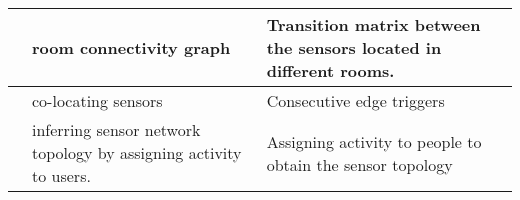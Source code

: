 \begin{table}[!ht]
\begin{tabularx}{\textwidth}{|X|X|X|}
\centering\text{\citeauthor{ellis2012creating}}\text{\cite{ellis2012creating}}                         & room connectivity graph                                                                                     & Transition matrix between the sensors located in different rooms.                                                                                                                                                                   \\ \hline
\centering\text{\citeauthor{muller2014automated}}\text{\cite{muller2014automated}}                     & co-locating sensors                                                                                         & Consecutive edge triggers                                                                                                                                                                                                           \\ \hline
\centering\text{\citeauthor{marinakis2005learning}}\text{\cite{marinakis2005learning}}                  & inferring sensor network topology by assigning activity to users. &Assigning activity to people to obtain the sensor topology                                                                                                                                            \\ \hline
\end{tabularx}
\end{table}


